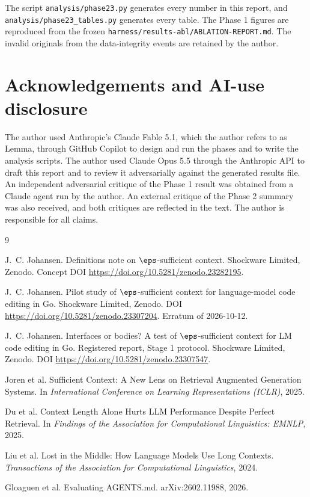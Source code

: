 The script \texttt{analysis/phase23.py} generates every number in this report, and \texttt{analysis/phase23\_tables.py} generates every table. The Phase 1 figures are reproduced from the frozen \texttt{harness/results-abl/ABLATION-REPORT.md}. The invalid originals from the data-integrity events are retained by the author.

\section*{Acknowledgements and AI-use disclosure}

The author used Anthropic's Claude Fable 5.1, which the author refers to as Lemma, through GitHub Copilot to design and run the phases and to write the analysis scripts. The author used Claude Opus 5.5 through the Anthropic API to draft this report and to review it adversarially against the generated results file. An independent adversarial critique of the Phase 1 result was obtained from a Claude agent run by the author. An external critique of the Phase 2 summary was also received, and both critiques are reflected in the text. The author is responsible for all claims.

\begin{thebibliography}{9}

J.~C. Johansen.
Definitions note on $\eps$-sufficient context.
Shockware Limited, Zenodo.
Concept DOI \url{https://doi.org/10.5281/zenodo.23282195}.

J.~C. Johansen.
Pilot study of $\eps$-sufficient context for language-model code editing in Go.
Shockware Limited, Zenodo.
DOI \url{https://doi.org/10.5281/zenodo.23307204}.
Erratum of 2026-10-12.

J.~C. Johansen.
Interfaces or bodies? A test of $\eps$-sufficient context for LM code editing in Go.
Registered report, Stage 1 protocol. Shockware Limited, Zenodo.
DOI \url{https://doi.org/10.5281/zenodo.23307547}.

Joren et al.
Sufficient Context: A New Lens on Retrieval Augmented Generation Systems.
In \emph{International Conference on Learning Representations (ICLR)}, 2025.

Du et al.
Context Length Alone Hurts LLM Performance Despite Perfect Retrieval.
In \emph{Findings of the Association for Computational Linguistics: EMNLP}, 2025.

Liu et al.
Lost in the Middle: How Language Models Use Long Contexts.
\emph{Transactions of the Association for Computational Linguistics}, 2024.

Gloaguen et al.
Evaluating AGENTS.md.
arXiv:2602.11988, 2026.

\end{thebibliography}
